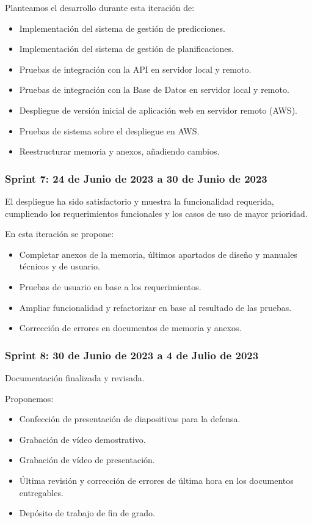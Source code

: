 Planteamos el desarrollo durante esta iteración de:

\begin{itemize}
    \item Implementación del sistema de gestión de predicciones.
    \item Implementación del sistema de gestión de planificaciones.
    \item Pruebas de integración con la API en servidor local y remoto.
    \item Pruebas de integración con la Base de Datos en servidor local y remoto.
    \item Despliegue de versión inicial de aplicación web en servidor remoto (AWS).
    \item Pruebas de sistema sobre el despliegue en AWS.
    \item Reestructurar memoria y anexos, añadiendo cambios.
\end{itemize}

\subsubsection{Sprint 7: 24 de Junio de 2023 a 30 de Junio de 2023}

El despliegue ha sido satisfactorio y muestra la funcionalidad requerida, cumpliendo los requerimientos funcionales y los casos de uso de mayor prioridad.

En esta iteración se propone:

\begin{itemize}
    \item Completar anexos de la memoria, últimos apartados de diseño y manuales técnicos y de usuario.
    \item Pruebas de usuario en base a los requerimientos.
    \item Ampliar funcionalidad y refactorizar en base al resultado de las pruebas.
    \item Corrección de errores en documentos de memoria y anexos.
\end{itemize}

\subsubsection{Sprint 8: 30 de Junio de 2023 a 4 de Julio de 2023}

Documentación finalizada y revisada.

Proponemos:
\begin{itemize}
    \item Confección de presentación de diapositivas para la defensa.
    \item Grabación de vídeo demostrativo.
    \item Grabación de vídeo de presentación.
    \item Última revisión y corrección de errores de última hora en los documentos entregables.
    \item Depósito de trabajo de fin de grado.
\end{itemize}

